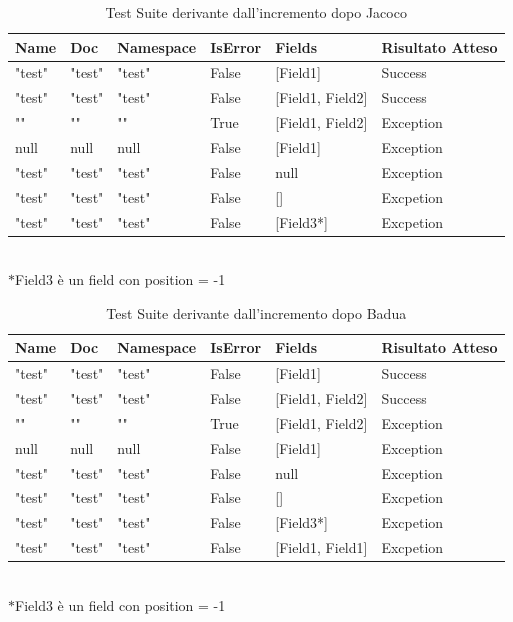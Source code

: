 \documentclass[12pt, a4paper]{article}
\begin{document}
\begin{table}[ht]
  \centering
  \caption[CreateRecord: Test Suite - Adequacy Control Flow]{Test Suite derivante dall'incremento dopo Jacoco}
  \begin{tabular}{|l|l|l|l|l|l|}
    \hline
    \textbf{Name} & \textbf{Doc} & \textbf{Namespace}  & \textbf{IsError} & \textbf{Fields} & \textbf{Risultato Atteso} \\
    \hline
    "test" & "test" & "test" & False & [Field1] & Success \\
    "test" & "test" & "test" & False & [Field1, Field2] & Success \\
    "" & "" & "" & True & [Field1, Field2] & Exception \\
    null & null & null & False & [Field1] & Exception \\
    "test" & "test" & "test" & False & null & Exception \\
    "test" & "test" & "test" & False & [] & Excpetion \\
    "test" & "test" & "test" & False & [Field3*] & Excpetion \\
    \hline
  \end{tabular}
   \\$\ast$Field3 è un field con position = -1
  \label{tab:Jacoco1CreateRecord}
\end{table}

\begin{table}[ht]
  \centering
  \caption[CreateRecord: Test Suite - Adequacy Control Flow]{Test Suite derivante dall'incremento dopo Badua}
  \begin{tabular}{|l|l|l|l|l|l|}
    \hline
    \textbf{Name} & \textbf{Doc} & \textbf{Namespace}  & \textbf{IsError} & \textbf{Fields} & \textbf{Risultato Atteso} \\
    \hline
    "test" & "test" & "test" & False & [Field1] & Success \\
    "test" & "test" & "test" & False & [Field1, Field2] & Success \\
    "" & "" & "" & True & [Field1, Field2] & Exception \\
    null & null & null & False & [Field1] & Exception \\
    "test" & "test" & "test" & False & null & Exception \\
    "test" & "test" & "test" & False & [] & Excpetion \\
    "test" & "test" & "test" & False & [Field3*] & Excpetion \\
    "test" & "test" & "test" & False & [Field1, Field1] & Excpetion \\
    \hline
  \end{tabular}
   \\$\ast$Field3 è un field con position = -1
  \label{tab:Badua1CreateRecord}
\end{table}
  
\end{document}
